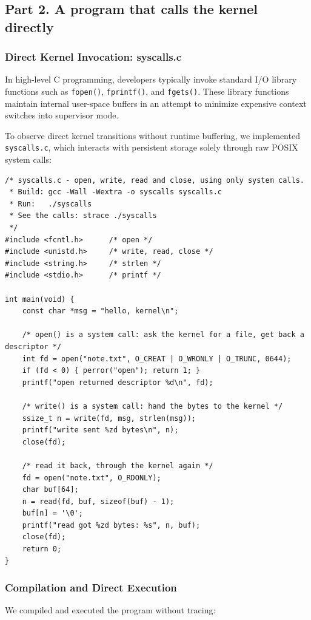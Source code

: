 \documentclass{labreport}
\begin{document}
\subsection{Part 2. A program that calls the kernel directly}

\subsubsection{Direct Kernel Invocation: syscalls.c}
In high-level C programming, developers typically invoke standard I/O library functions such as \texttt{fopen()}, \texttt{fprintf()}, and \texttt{fgets()}. These library functions maintain internal user-space buffers in an attempt to minimize expensive context switches into supervisor mode.

To observe direct kernel transitions without runtime buffering, we implemented \texttt{syscalls.c}, which interacts with persistent storage solely through raw POSIX system calls:

\begin{lstlisting}[style=c]
/* syscalls.c - open, write, read and close, using only system calls.
 * Build: gcc -Wall -Wextra -o syscalls syscalls.c
 * Run:   ./syscalls
 * See the calls: strace ./syscalls
 */
#include <fcntl.h>      /* open */
#include <unistd.h>     /* write, read, close */
#include <string.h>     /* strlen */
#include <stdio.h>      /* printf */

int main(void) {
    const char *msg = "hello, kernel\n";

    /* open() is a system call: ask the kernel for a file, get back a descriptor */
    int fd = open("note.txt", O_CREAT | O_WRONLY | O_TRUNC, 0644);
    if (fd < 0) { perror("open"); return 1; }
    printf("open returned descriptor %d\n", fd);

    /* write() is a system call: hand the bytes to the kernel */
    ssize_t n = write(fd, msg, strlen(msg));
    printf("write sent %zd bytes\n", n);
    close(fd);

    /* read it back, through the kernel again */
    fd = open("note.txt", O_RDONLY);
    char buf[64];
    n = read(fd, buf, sizeof(buf) - 1);
    buf[n] = '\0';
    printf("read got %zd bytes: %s", n, buf);
    close(fd);
    return 0;
}
\end{lstlisting}

\subsubsection{Compilation and Direct Execution}
We compiled and executed the program without tracing:
\end{document}

